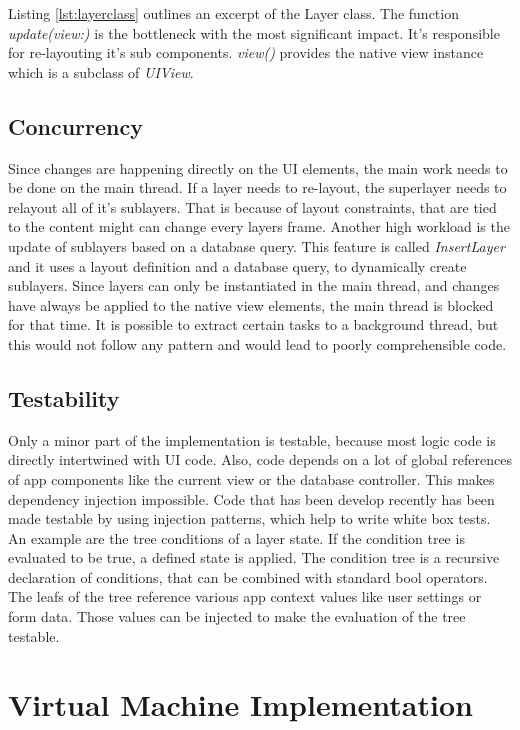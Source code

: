 Listing \ref{lst:layerclass} outlines an excerpt of the Layer class.
The function \textit{update(view:)} is the bottleneck with the most significant impact.
It's responsible for re-layouting it's sub components.
\textit{view()} provides the native view instance which is a subclass of \textit{UIView}.


\subsection{Concurrency}

Since changes are happening directly on the \ac{UI} elements, the main work needs to be done on the main thread.
If a layer needs to re-layout, the superlayer needs to relayout all of it's sublayers.
That is because of layout constraints, that are tied to the content might can change every layers frame.
Another high workload is the update of sublayers based on a database query.
This feature is called \textit{InsertLayer} and it uses a layout definition and a database query, to dynamically create sublayers.
Since layers can only be instantiated in the main thread, and changes have always be applied to the native view elements, the main thread is blocked for that time.
It is possible to extract certain tasks to a background thread, but this would not follow any pattern and would lead to poorly comprehensible code.

\subsection{Testability}

Only a minor part of the implementation is testable, because most logic code is directly intertwined with \ac{UI} code.
Also, code depends on a lot of global references of app components like the current view or the database controller.
This makes dependency injection impossible.
Code that has been develop recently has been made testable by using injection patterns, which help to write white box tests.
An example are the tree conditions of a layer state.
If the condition tree is evaluated to be true, a defined state is applied.
The condition tree is a recursive declaration of conditions, that can be combined with standard bool operators.
The leafs of the tree reference various app context values like user settings or form data.
Those values can be injected to make the evaluation of the tree testable.




\section{Virtual Machine Implementation}
\label{sec:virtualmachneimplementation}


